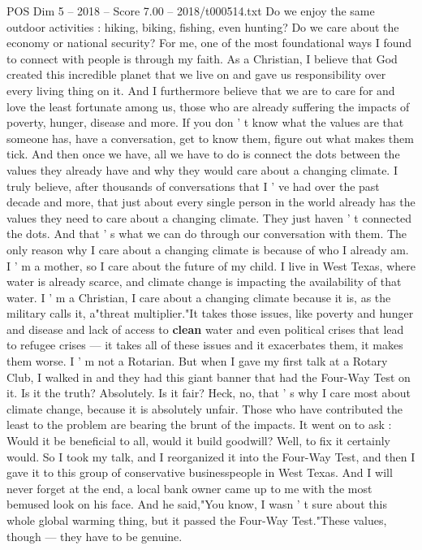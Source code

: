 \begin{textsample}{POS Dim 5 – 2018 – Score 7.00 – 2018/t000514.txt}
Do we enjoy the same outdoor activities : hiking, biking, fishing, even hunting?
Do we care about the economy or national security?
For me, one of the most foundational ways I found to connect with people is through my faith.
As a Christian, I believe that God created this incredible planet that we live on and gave us responsibility over every living thing on it.
And I furthermore believe that we are to care for and love the least fortunate among us, those who are already suffering the impacts of poverty, hunger, disease and more.
If you don ' t know what the values are that someone has, have a conversation, get to know them, figure out what makes them tick.
And then once we have, all we have to do is connect the dots between the values they already have and why they would care about a changing climate.
I truly believe, after thousands of conversations that I ' ve had over the past decade and more, that just about every single person in the world already has the values they need to care about a changing climate.
They just haven ' t connected the dots.
And that ' s what we can do through our conversation with them.
The only reason why I care about a changing climate is because of who I already am.
I ' m a mother, so I care about the future of my child.
I live in West Texas, where water is already scarce, and climate change is impacting the availability of that water.
I ' m a Christian, I care about a changing climate because it is, as the military calls it, a"threat multiplier."It takes those issues, like poverty and hunger and disease and lack of access to \textbf{clean} water and even political crises that lead to refugee crises — it takes all of these issues and it exacerbates them, it makes them worse.
I ' m not a Rotarian.
But when I gave my first talk at a Rotary Club, I walked in and they had this giant banner that had the Four-Way Test on it.
Is it the truth?
Absolutely.
Is it fair?
Heck, no, that ' s why I care most about climate change, because it is absolutely unfair.
Those who have contributed the least to the problem are bearing the brunt of the impacts.
It went on to ask : Would it be beneficial to all, would it build goodwill?
Well, to fix it certainly would.
So I took my talk, and I reorganized it into the Four-Way Test, and then I gave it to this group of conservative businesspeople in West Texas.
And I will never forget at the end, a local bank owner came up to me with the most bemused look on his face.
And he said,"You know, I wasn ' t sure about this whole global warming thing, but it passed the Four-Way Test."These values, though — they have to be genuine.

\end{textsample}

